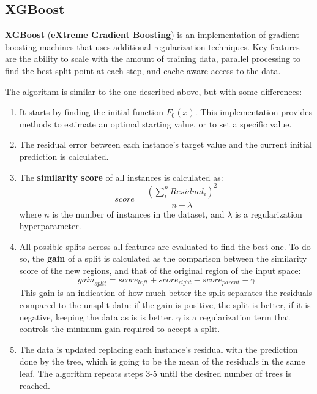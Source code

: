 \subsection{XGBoost}

\textbf{XGBoost} (\textbf{eXtreme Gradient Boosting}) is an implementation of gradient boosting machines that uses additional regularization techniques. Key features are the ability to scale with the amount of training data, parallel processing to find the best split point at each step, and cache aware access to the data.

The algorithm is similar to the one described above, but with some differences:
\begin{enumerate}
    \item It starts by finding the initial function $F_0(x)$. This implementation provides methods to estimate an optimal starting value, or to set a specific value.
    
    \item The residual error between each instance's target value and the current initial prediction is calculated.

    \item The \textbf{similarity score} of all instances is calculated as:
    \begin{equation*}
        \textit{score} = \frac{(\sum_i^n \textit{Residual}_i)^2}{n + \lambda}
    \end{equation*}
    where $n$ is the number of instances in the dataset, and $\lambda$ is a regularization hyperparameter.

    \item All possible splits across all features are evaluated to find the best one. To do so, the \textbf{gain} of a split is calculated as the comparison between the similarity score of the new regions, and that of the original region of the input space:
    \begin{equation*}
        \textit{gain}_{split} = \textit{score}_{\textit{left}} + \textit{score}_{\textit{right}} - \textit{score}_{\textit{parent}} - \gamma
    \end{equation*}
    This gain is an indication of how much better the split separates the residuals compared to the unsplit data: if the gain is positive, the split is better, if it is negative, keeping the data as is is better. $\gamma$ is a regularization term that controls the minimum gain required to accept a split.

    \item The data is updated replacing each instance's residual with the prediction done by the tree, which is going to be the mean of the residuals in the same leaf. The algorithm repeats steps 3-5 until the desired number of trees is reached.
\end{enumerate}

